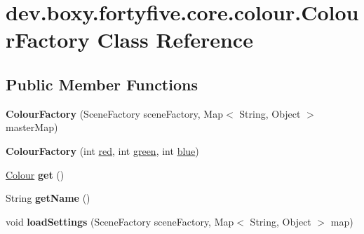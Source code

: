 \hypertarget{classdev_1_1boxy_1_1fortyfive_1_1core_1_1colour_1_1_colour_factory}{
\section{dev.boxy.fortyfive.core.colour.ColourFactory Class Reference}
\label{d6/df9/classdev_1_1boxy_1_1fortyfive_1_1core_1_1colour_1_1_colour_factory}
}
\subsection*{Public Member Functions}
\begin{DoxyCompactItemize}
\item 
\hypertarget{classdev_1_1boxy_1_1fortyfive_1_1core_1_1colour_1_1_colour_factory_a2389d91e8fb7fec14923860b6fcf4266}{
{\bfseries ColourFactory} (SceneFactory sceneFactory, Map$<$ String, Object $>$ masterMap)}
\label{d6/df9/classdev_1_1boxy_1_1fortyfive_1_1core_1_1colour_1_1_colour_factory_a2389d91e8fb7fec14923860b6fcf4266}

\item 
\hypertarget{classdev_1_1boxy_1_1fortyfive_1_1core_1_1colour_1_1_colour_factory_ac74ace648bb96662bb01e6a09f67c050}{
{\bfseries ColourFactory} (int \hyperlink{group__colours_gab62f99627952fcf9923c257b8a6da024}{red}, int \hyperlink{group__colours_gab377d979269fd05f929493dc79ee074a}{green}, int \hyperlink{group__colours_gaa387e90b3938158d073d2aeae5105111}{blue})}
\label{d6/df9/classdev_1_1boxy_1_1fortyfive_1_1core_1_1colour_1_1_colour_factory_ac74ace648bb96662bb01e6a09f67c050}

\item 
\hypertarget{classdev_1_1boxy_1_1fortyfive_1_1core_1_1colour_1_1_colour_factory_a2464c0e29368b24b3b5e5c97c41d5df7}{
\hyperlink{classdev_1_1boxy_1_1fortyfive_1_1core_1_1colour_1_1_colour}{Colour} {\bfseries get} ()}
\label{d6/df9/classdev_1_1boxy_1_1fortyfive_1_1core_1_1colour_1_1_colour_factory_a2464c0e29368b24b3b5e5c97c41d5df7}

\item 
\hypertarget{classdev_1_1boxy_1_1fortyfive_1_1core_1_1colour_1_1_colour_factory_ada173d57ac82cd6ec136c24e7711732d}{
String {\bfseries getName} ()}
\label{d6/df9/classdev_1_1boxy_1_1fortyfive_1_1core_1_1colour_1_1_colour_factory_ada173d57ac82cd6ec136c24e7711732d}

\item 
\hypertarget{classdev_1_1boxy_1_1fortyfive_1_1core_1_1colour_1_1_colour_factory_a47d75be8651385d77d1ce1e04164cfc3}{
void {\bfseries loadSettings} (SceneFactory sceneFactory, Map$<$ String, Object $>$ map)}
\label{d6/df9/classdev_1_1boxy_1_1fortyfive_1_1core_1_1colour_1_1_colour_factory_a47d75be8651385d77d1ce1e04164cfc3}

\end{DoxyCompactItemize}
